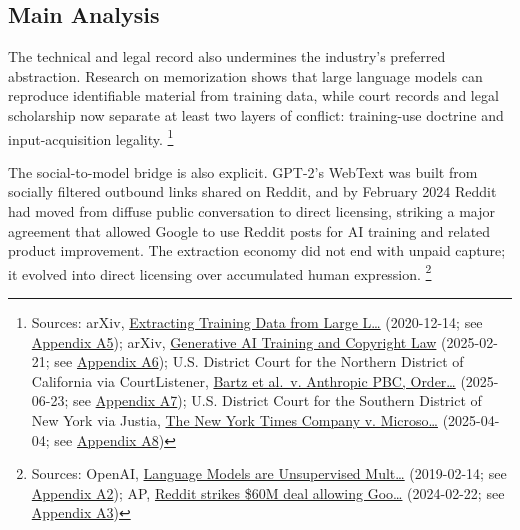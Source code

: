 \documentclass[
  american,
  11pt,
  letterpaper,
]{article}
\begin{document}
\subsection{Main Analysis}\label{main-analysis}

The technical and legal record also undermines the industry's preferred
abstraction. Research on memorization shows that large language models
can reproduce identifiable material from training data, while court
records and legal scholarship now separate at least two layers of
conflict: training-use doctrine and input-acquisition legality.
\footnote{Sources: arXiv,
  \href{https://arxiv.org/abs/2012.07805}{Extracting Training Data from
  Large L\ldots{}} (2020-12-14; see
  \hyperref[appendix-a5-extracting-training-data-from-large-language-models]{Appendix
  A5}); arXiv, \href{https://arxiv.org/abs/2502.15858}{Generative AI
  Training and Copyright Law} (2025-02-21; see
  \hyperref[appendix-a6-generative-ai-training-and-copyright-law]{Appendix
  A6}); U.S. District Court for the Northern District of California via
  CourtListener,
  \href{https://storage.courtlistener.com/recap/gov.uscourts.cand.434709/gov.uscourts.cand.434709.231.0_3.pdf}{Bartz
  et al.~v. Anthropic PBC, Order\ldots{}} (2025-06-23; see
  \hyperref[appendix-a7-bartz-et-al-v-anthropic-pbc-order-on-fair-use]{Appendix
  A7}); U.S. District Court for the Southern District of New York via
  Justia,
  \href{https://cases.justia.com/federal/district-courts/new-york/nysdce/1\%3A2023cv11195/612697/514/0.pdf?ts=1743868265}{The
  New York Times Company v. Microso\ldots{}} (2025-04-04; see
  \hyperref[appendix-a8-the-new-york-times-company-v-microsoft-corporation-et-al-opinion-on-motions-to-dismiss]{Appendix
  A8})}

The social-to-model bridge is also explicit. GPT-2's WebText was built
from socially filtered outbound links shared on Reddit, and by February
2024 Reddit had moved from diffuse public conversation to direct
licensing, striking a major agreement that allowed Google to use Reddit
posts for AI training and related product improvement. The extraction
economy did not end with unpaid capture; it evolved into direct
licensing over accumulated human expression. \footnote{Sources: OpenAI,
  \href{https://cdn.openai.com/better-language-models/language_models_are_unsupervised_multitask_learners.pdf}{Language
  Models are Unsupervised Mult\ldots{}} (2019-02-14; see
  \hyperref[appendix-a2-language-models-are-unsupervised-multitask-learners]{Appendix
  A2}); AP,
  \href{https://apnews.com/article/a7f131c7cb4225307134ef21d3c6a708}{Reddit
  strikes \$60M deal allowing Goo\ldots{}} (2024-02-22; see
  \hyperref[appendix-a3-reddit-strikes-60m-deal-allowing-google-to-train-ai-models-on-its-posts-unveils-ipo-plans]{Appendix
  A3})}
\end{document}
